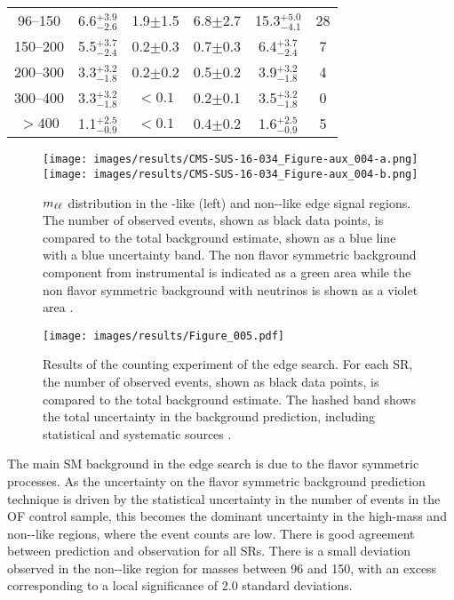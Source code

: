\begin{table}[!hbtp]
\begin{tabular}{ c  c  c  c  c  c}
96--150   &  6.6$^{+3.9}_{-2.6}$    & 1.9$\pm$1.5   & 6.8$\pm$2.7  &  15.3$^{+5.0}_{-4.1}$ & 28 \\
150--200  &  5.5$^{+3.7}_{-2.4}$    & 0.2$\pm$0.3   & 0.7$\pm$0.3  &  6.4$^{+3.7}_{-2.4}$ & 7 \\
200--300  &  3.3$^{+3.2}_{-1.8}$    & 0.2$\pm$0.2   & 0.5$\pm$0.2  &  3.9$^{+3.2}_{-1.8}$ & 4 \\
300--400  &  3.3$^{+3.2}_{-1.8}$    & $< 0.1$       & 0.2$\pm$0.1  &  3.5$^{+3.2}_{-1.8}$ & 0 \\
$> 400$   &  1.1$^{+2.5}_{-0.9}$    & $< 0.1$       & 0.4$\pm$0.2  &  1.6$^{+2.5}_{-0.9}$ & 5 \\
\hline
\hline
\end{tabular}
\end{table}
\begin{figure}[htbp!]
\begin{center}
\texttt{[image: images/results/CMS-SUS-16-034\_Figure-aux\_004-a.png]}
\texttt{[image: images/results/CMS-SUS-16-034\_Figure-aux\_004-b.png]}
\caption{$m_{\ell\ell}$ distribution in the \ttbar-like (left) and non-\ttbar-like edge signal regions. The number of observed events, shown as black data points, is compared to the total background estimate, shown as a blue line with a blue uncertainty band. The non flavor symmetric background component from instrumental \ptmiss is indicated as a green area while the non flavor symmetric background with neutrinos is shown as a violet area \cite{Sirunyan:2017qaj}.}
\label{fig:resultsEdgeMll}
\end{center}
\end{figure}                                                                                                                                                                                   
\begin{figure}[htbp!]
\begin{center}
\texttt{[image: images/results/Figure\_005.pdf]}
\caption{Results of the counting experiment of the edge search. For each SR, the number of observed events, shown as black data points, is compared to the total background estimate.  The hashed band shows the total uncertainty in the background prediction, including statistical and systematic sources \cite{Sirunyan:2017qaj}.}
\label{fig:resultsEdge}
\end{center}
\end{figure}                        
\noindent\justify                                                                                                                                               
The main SM background in the edge search is due to the flavor symmetric processes. 
As the uncertainty on the flavor symmetric background prediction technique is driven by the statistical uncertainty in the number of events in the OF control sample, this becomes the dominant uncertainty in the high-mass and non-\ttbar-like regions, where the event counts are low. 
There is good agreement between prediction and observation for all SRs. 
There is a small deviation observed in the non-\ttbar-like region for masses between 96 and 150\GeV, with an excess corresponding to a local significance of 2.0 standard deviations.

